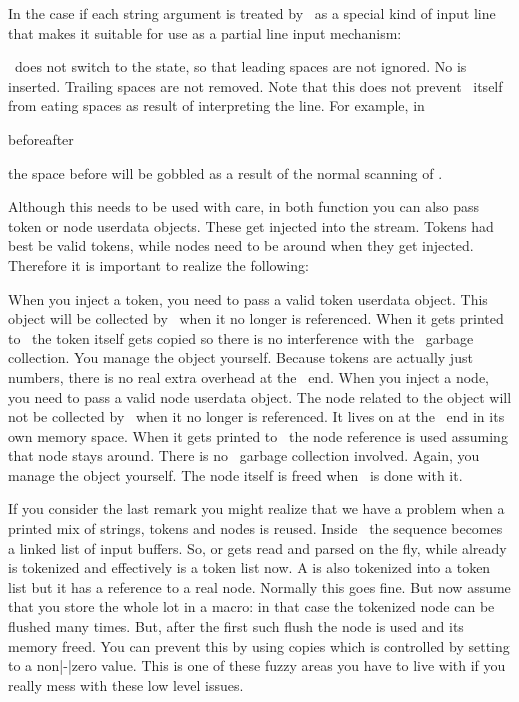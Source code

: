 In the case if  each string argument is treated by \TEX\ as a
special kind of input line that makes it suitable for use as a partial line input
mechanism:

\startitemize[packed]
\startitem
    \TEX\ does not switch to the  state, so that leading spaces
    are not ignored.
\stopitem
\startitem
    No \type {\endlinechar} is inserted.
\stopitem
\startitem
    Trailing spaces are not removed. Note that this does not prevent \TEX\ itself
    from eating spaces as result of interpreting the line. For example, in

    \starttyping
    beforeafter
    \stoptyping

    the space before  will be gobbled as a result of the \quote
    {normal} scanning of .
\stopitem
\stopitemize

Although this needs to be used with care, in both function you can also pass
token or node userdata objects. These get injected into the stream. Tokens had
best be valid tokens, while nodes need to be around when they get injected.
Therefore it is important to realize the following:

\startitemize
\startitem
    When you inject a token, you need to pass a valid token userdata object. This
    object will be collected by \LUA\ when it no longer is referenced. When it gets
    printed to \TEX\ the token itself gets copied so there is no interference with the
    \LUA\ garbage collection. You manage the object yourself. Because tokens are
    actually just numbers, there is no real extra overhead at the \TEX\ end.
\stopitem
\startitem
    When you inject a node, you need to pass a valid node userdata object. The
    node related to the object will not be collected by \LUA\ when it no longer
    is referenced. It lives on at the \TEX\ end in its own memory space. When it
    gets printed to \TEX\ the node reference is used assuming that node stays
    around. There is no \LUA\ garbage collection involved. Again, you manage the
    object yourself. The node itself is freed when \TEX\ is done with it.
\stopitem
\stopitemize

If you consider the last remark you might realize that we have a problem when a
printed mix of strings, tokens and nodes is reused. Inside \TEX\ the sequence
becomes a linked list of input buffers. So,  or 
gets read and parsed on the fly, while  already is
tokenized and effectively is a token list now. A  is also
tokenized into a token list but it has a reference to a real node. Normally this
goes fine. But now assume that you store the whole lot in a macro: in that case
the tokenized node can be flushed many times. But, after the first such flush the
node is used and its memory freed. You can prevent this by using copies which is
controlled by setting \type {\luacopyinputnodes} to a non|-|zero value. This is one
of these fuzzy areas you have to live with if you really mess with these low
level issues.


